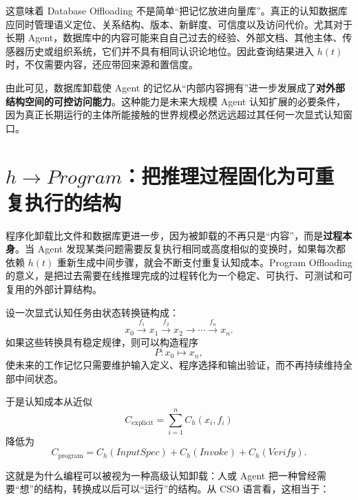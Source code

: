 这意味着 Database Offloading 不是简单“把记忆放进向量库”。真正的认知数据库应同时管理语义定位、关系结构、版本、新鲜度、可信度以及访问代价。尤其对于长期 Agent，数据库中的内容可能来自自己过去的经验、外部文档、其他主体、传感器历史或组织系统，它们并不具有相同认识论地位。因此查询结果进入 $h(t)$ 时，不仅需要内容，还应带回来源和置信度。

由此可见，数据库卸载使 Agent 的记忆从“内部内容拥有”进一步发展成了\textbf{对外部结构空间的可控访问能力}。这种能力是未来大规模 Agent 认知扩展的必要条件，因为真正长期运行的主体所能接触的世界规模必然远远超过其任何一次显式认知窗口。

\section{$h\rightarrow Program$：把推理过程固化为可重复执行的结构}

程序化卸载比文件和数据库更进一步，因为被卸载的不再只是“内容”，而是\textbf{过程本身}。当 Agent 发现某类问题需要反复执行相同或高度相似的变换时，如果每次都依赖 $h(t)$ 重新生成中间步骤，就会不断支付重复认知成本。Program Offloading 的意义，是把过去需要在线推理完成的过程转化为一个稳定、可执行、可测试和可复用的外部计算结构。

设一次显式认知任务由状态转换链构成：
\begin{equation}
x_0
\xrightarrow{f_1}
x_1
\xrightarrow{f_2}
x_2
\rightarrow
\cdots
\xrightarrow{f_n}
x_n.
\end{equation}
如果这些转换具有稳定规律，则可以构造程序
\begin{equation}
P:
x_0
\mapsto
x_n,
\end{equation}
使未来的工作记忆只需要维护输入定义、程序选择和输出验证，而不再持续维持全部中间状态。

于是认知成本从近似
\begin{equation}
C_{\mathrm{explicit}}
=
\sum_{i=1}^{n}C_h(x_i,f_i)
\end{equation}
降低为
\begin{equation}
C_{\mathrm{program}}
=
C_h(InputSpec)
+
C_h(Invoke)
+
C_h(Verify).
\end{equation}

这就是为什么编程可以被视为一种高级认知卸载：人或 Agent 把一种曾经需要“想”的结构，转换成以后可以“运行”的结构。从 CSO 语言看，这相当于：
\begin{statementbox}
\centering
{}
\end{statementbox}

